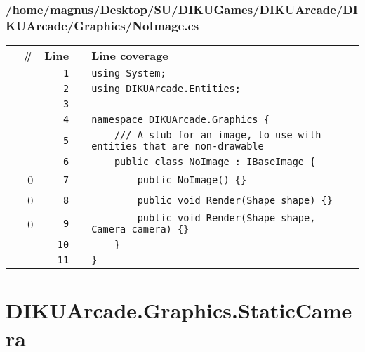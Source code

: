 \documentclass[a4paper,landscape,10pt]{article}
\begin{document}
\subsubsection{/home/magnus/Desktop/SU/DIKUGames/DIKUArcade/DIKUArcade/Graphics/NoImage.cs}
\begin{longtable}[l]{lrrll}
\textbf{} & \textbf{\#} & \textbf{Line} & \textbf{} & \textbf{Line coverage}\\
\cellcolor{gray} &  & \verb~1~ & & \verb~using System;~\\
\cellcolor{gray} &  & \verb~2~ & & \verb~using DIKUArcade.Entities;~\\
\cellcolor{gray} &  & \verb~3~ & & \verb~~\\
\cellcolor{gray} &  & \verb~4~ & & \verb~namespace DIKUArcade.Graphics {~\\
\cellcolor{gray} &  & \verb~5~ & & \verb~    /// A stub for an image, to use with entities that are non-drawable~\\
\cellcolor{gray} &  & \verb~6~ & & \verb~    public class NoImage : IBaseImage {~\\
\cellcolor{red} & 0 & \verb~7~ & & \verb~        public NoImage() {}~\\
\cellcolor{red} & 0 & \verb~8~ & & \verb~        public void Render(Shape shape) {}~\\
\cellcolor{red} & 0 & \verb~9~ & & \verb~        public void Render(Shape shape, Camera camera) {}~\\
\cellcolor{gray} &  & \verb~10~ & & \verb~    }~\\
\cellcolor{gray} &  & \verb~11~ & & \verb~}~\\
\end{longtable}
\newpage
\section{DIKUArcade.Graphics.StaticCamera}
\end{document}
